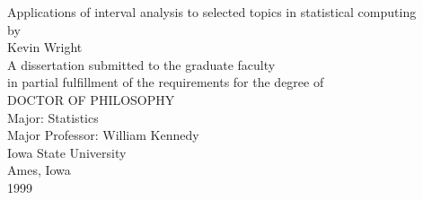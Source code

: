 \documentclass[12pt,letterpaper]{report}
\begin{document}


\begin{titlepage}
\begin{center}

Applications of interval analysis to selected topics in statistical computing\\
\vspace{.25 in}
by\\
\vspace{.25 in}
Kevin Wright\\
\vspace{.5 in}
A dissertation submitted to the graduate faculty\\
\vspace{.5 in}
in partial fulfillment of the requirements for the degree of\\
\vspace{.25 in}
DOCTOR OF PHILOSOPHY\\
\vspace{1 in}
Major: Statistics\\
\vspace{.25 in}
Major Professor: William Kennedy\\
\vspace{1.5 in}
Iowa State University\\
\vspace{.25 in}
Ames, Iowa\\
\vspace{.25 in}
1999\\

\end{center}
\end{titlepage}

\tableofcontents

\newpage
{}











\end{document}
